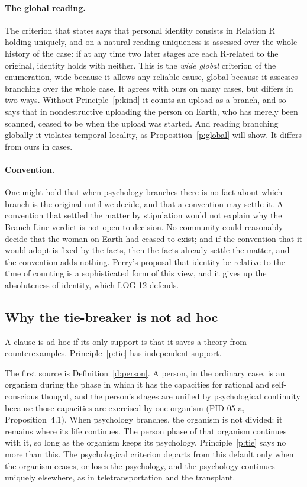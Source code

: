\documentclass{situationist-preprint}
\begin{document}
\paragraph{The global reading.} The criterion that \citet{Parfit1984} states says that personal identity consists in Relation R holding uniquely, and on a natural reading uniqueness is assessed over the whole history of the case: if at any time two later stages are each R-related to the original, identity holds with neither. This is the \emph{wide global} criterion of the enumeration, wide because it allows any reliable cause, global because it assesses branching over the whole case. It agrees with ours on many cases, but differs in two ways. Without Principle~\ref{p:kind} it counts an upload as a branch, and so says that in nondestructive uploading the person on Earth, who has merely been scanned, ceased to be when the upload was started. And reading branching globally it violates temporal locality, as Proposition~\ref{p:global} will show. It differs from ours in \stdisW{} cases.

\paragraph{Convention.} One might hold that when psychology branches there is no fact about which branch is the original until we decide, and that a convention may settle it. A convention that settled the matter by stipulation would not explain why the Branch-Line verdict is not open to decision. No community could reasonably decide that the woman on Earth had ceased to exist; and if the convention that it would adopt is fixed by the facts, then the facts already settle the matter, and the convention adds nothing. Perry's proposal that identity be relative to the time of counting \citep{Perry1972} is a sophisticated form of this view, and it gives up the absoluteness of identity, which LOG-12 defends.

\subsection{Why the tie-breaker is not ad hoc}

A clause is ad hoc if its only support is that it saves a theory from counterexamples. Principle~\ref{p:tie} has independent support.

The first source is Definition~\ref{d:person}. A person, in the ordinary case, is an organism during the phase in which it has the capacities for rational and self-conscious thought, and the person's stages are unified by psychological continuity because those capacities are exercised by one organism (PID-05-a, Proposition~4.1). When psychology branches, the organism is not divided: it remains where its life continues. The person phase of that organism continues with it, so long as the organism keeps its psychology. Principle~\ref{p:tie} says no more than this. The psychological criterion departs from this default only when the organism ceases, or loses the psychology, and the psychology continues uniquely elsewhere, as in teletransportation and the transplant.
\end{document}
